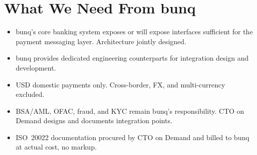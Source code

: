 
\needspace{10cm}
\section{What We Need From bunq}

\begin{itemize}
\item bunq's core banking system exposes or will expose interfaces sufficient for the payment messaging layer. Architecture jointly designed.
\item bunq provides dedicated engineering counterparts for integration design and development.
\item USD domestic payments only. Cross-border, FX, and multi-currency excluded.
\item BSA/AML, OFAC, fraud, and KYC remain bunq's responsibility. CTO on Demand designs and documents integration points.
\item ISO~20022 documentation procured by CTO on Demand and billed to bunq at actual cost, no markup.
\end{itemize}
